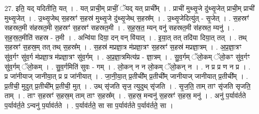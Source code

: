 \documentclass[17pt]{extarticle}
\begin{document}
27. इति॒ यद् यदितीति॒ यत् । . यत् प्राची॒म् प्राचीं॒ ॅयद् यत् प्राची᳚म् । . प्राची॑ मुथ्सृ॒जे दु॑थ्सृ॒जेत् प्राची॒म् प्राची॑ मुथ्सृ॒जेत् । . उ॒थ्सृ॒जेथ् स॒हस्रꣳ॑ स॒हस्र॑ मुथ्सृ॒जे दु॑थ्सृ॒जेथ् स॒हस्र᳚म् । . उ॒थ्सृ॒जेदित्यु॑त् - सृ॒जेत् । . स॒हस्रꣳ॑ सहस्रत॒मी स॑हस्रत॒मी स॒हस्रꣳ॑ स॒हस्रꣳ॑ सहस्रत॒मी । . स॒ह॒स्र॒त॒ म्यन् वनु॑ सहस्रत॒मी स॑हस्रत॒ म्यनु॑ । . स॒ह॒स्र॒त॒मीति॑ सहस्र - त॒मी । . अन्वि॑या दिया॒ दन् वन् वि॑यात् । . इ॒या॒त् तत् तदि॑या दिया॒त् तत् । . तथ् स॒हस्रꣳ॑ स॒हस्र॒म् तत् तथ् स॒हस्र᳚म् । . स॒हस्र॑ मप्रज्ञा॒त्र म॑प्रज्ञा॒त्रꣳ स॒हस्रꣳ॑ स॒हस्र॑ मप्रज्ञा॒त्रम् । . अ॒प्र॒ज्ञा॒त्रꣳ सु॑व॒र्गꣳ सु॑व॒र्ग म॑प्रज्ञा॒त्र म॑प्रज्ञा॒त्रꣳ सु॑व॒र्गम् । . अ॒प्र॒ज्ञा॒त्रमित्य॑प्र - ज्ञा॒त्रम् । . सु॒व॒र्गम् ॅलो॒कम् ॅलो॒कꣳ सु॑व॒र्गꣳ सु॑व॒र्गम् ॅलो॒कम् । . सु॒व॒र्गमिति॑ सुवः - गम् । . लो॒कन् न न लो॒कम् ॅलो॒कन् न । . न प्र प्र ण न प्र । . प्र जा॑नीयाज् जानीया॒त् प्र प्र जा॑नीयात् । . जा॒नी॒या॒त् प्र॒तीची᳚म् प्र॒तीची᳚म् जानीयाज् जानीयात् प्र॒तीची᳚म् । . प्र॒तीची॒ मुदुत् प्र॒तीची᳚म् प्र॒तीची॒ मुत् । . उथ् सृ॑जति सृज॒ त्युदुथ् सृ॑जति । . सृ॒ज॒ति॒ ताम् ताꣳ सृ॑जति सृजति॒ ताम् । . ताꣳ स॒हस्रꣳ॑ स॒हस्र॒म् ताम् ताꣳ स॒हस्र᳚म् । . स॒हस्र॒ मन्वनु॑ स॒हस्रꣳ॑ स॒हस्र॒ मनु॑ । . अनु॑ प॒र्याव॑र्तते प॒र्याव॑र्त॒ते ऽन्वनु॑ प॒र्याव॑र्तते । . प॒र्याव॑र्तते॒ सा सा प॒र्याव॑र्तते प॒र्याव॑र्तते॒ सा । \newline
\end{document}
